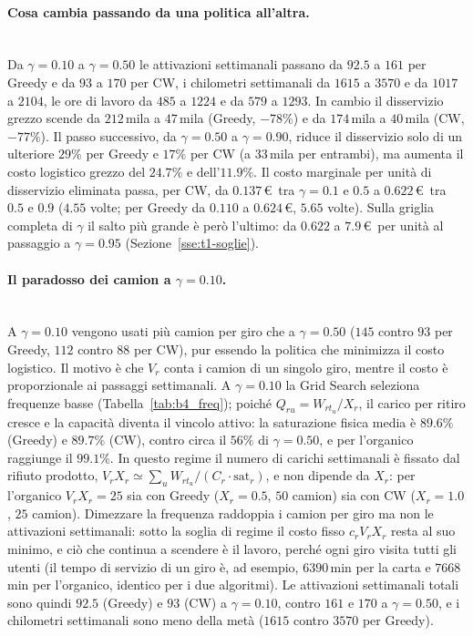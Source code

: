 \paragraph{Cosa cambia passando da una politica all'altra.}\mbox{}\\
Da $\gamma=0.10$ a $\gamma=0.50$ le attivazioni settimanali passano da $92.5$ a $161$ per Greedy e da $93$ a $170$ per CW, i chilometri settimanali da $1615$ a $3570$ e da $1017$ a $2104$, le ore di lavoro da $485$ a $1224$ e da $579$ a $1293$. In cambio il disservizio grezzo scende da $212$\,mila a $47$\,mila (Greedy, $-78\%$) e da $174$\,mila a $40$\,mila (CW, $-77\%$). Il passo successivo, da $\gamma=0.50$ a $\gamma=0.90$, riduce il disservizio solo di un ulteriore $29\%$ per Greedy e $17\%$ per CW (a $33$\,mila per entrambi), ma aumenta il costo logistico grezzo del $24.7\%$ e dell'$11.9\%$. Il costo marginale per unità di disservizio eliminata passa, per CW, da $0.137$\,\euro\ tra $\gamma=0.1$ e $0.5$ a $0.622$\,\euro\ tra $0.5$ e $0.9$ ($4.55$ volte; per Greedy da $0.110$ a $0.624$\,\euro, $5.65$ volte). Sulla griglia completa di $\gamma$ il salto più grande è però l'ultimo: da $0.622$ a $7.9$\,\euro\ per unità al passaggio a $\gamma=0.95$ (Sezione~\ref{sse:t1-soglie}).

\paragraph{Il paradosso dei camion a $\gamma=0.10$.}\mbox{}\\
A $\gamma=0.10$ vengono usati più camion per giro che a $\gamma=0.50$ ($145$ contro $93$ per Greedy, $112$ contro $88$ per CW), pur essendo la politica che minimizza il costo logistico. Il motivo è che $V_r$ conta i camion di un singolo giro, mentre il costo è proporzionale ai passaggi settimanali. A $\gamma=0.10$ la Grid Search seleziona frequenze basse (Tabella~\ref{tab:b4_freq}); poiché $Q_{ru}=W_{rt_u}/X_r$, il carico per ritiro cresce e la capacità diventa il vincolo attivo: la saturazione fisica media è $89.6\%$ (Greedy) e $89.7\%$ (CW), contro circa il $56\%$ di $\gamma=0.50$, e per l'organico raggiunge il $99.1\%$. In questo regime il numero di carichi settimanali è fissato dal rifiuto prodotto, $V_rX_r\simeq\sum_u W_{rt_u}/(C_r\cdot\mathrm{sat}_r)$, e non dipende da $X_r$: per l'organico $V_rX_r=25$ sia con Greedy ($X_r=0.5$, $50$ camion) sia con CW ($X_r=1.0$, $25$ camion). Dimezzare la frequenza raddoppia i camion per giro ma non le attivazioni settimanali: sotto la soglia di regime il costo fisso $c_rV_rX_r$ resta al suo minimo, e ciò che continua a scendere è il lavoro, perché ogni giro visita tutti gli utenti (il tempo di servizio di un giro è, ad esempio, $6390$\,min per la carta e $7668$\,min per l'organico, identico per i due algoritmi). Le attivazioni settimanali totali sono quindi $92.5$ (Greedy) e $93$ (CW) a $\gamma=0.10$, contro $161$ e $170$ a $\gamma=0.50$, e i chilometri settimanali sono meno della metà ($1615$ contro $3570$ per Greedy).

